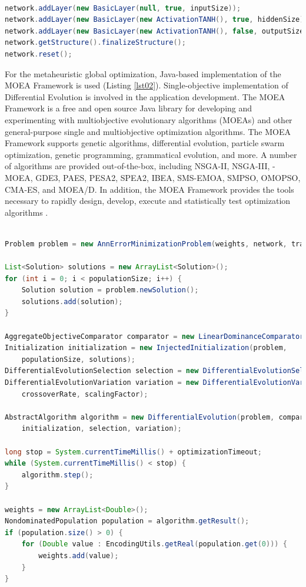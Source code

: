 \documentclass[a4paper,conference]{IEEEtran}
\begin{document}
\begin{lstlisting}[caption=Building artificial neural network, language=Java, basicstyle=\tiny, label=lst01]

network.addLayer(new BasicLayer(null, true, inputSize));
network.addLayer(new BasicLayer(new ActivationTANH(), true, hiddenSize));
network.addLayer(new BasicLayer(new ActivationTANH(), false, outputSize));
network.getStructure().finalizeStructure();
network.reset();

\end{lstlisting}

For the metaheuristic global optimization, Java-based implementation of the MOEA Framework is used (Listing \ref{lst02}). Single-objective implementation of Differential Evolution is involved in the application development. The MOEA Framework is a free and open source Java library for developing and experimenting with multiobjective evolutionary algorithms (MOEAs) and other general-purpose single and multiobjective optimization algorithms. The MOEA Framework supports genetic algorithms, differential evolution, particle swarm optimization, genetic programming, grammatical evolution, and more. A number of algorithms are provided out-of-the-box, including NSGA-II, NSGA-III, \varepsilon -MOEA, GDE3, PAES, PESA2, SPEA2, IBEA, SMS-EMOA, SMPSO, OMOPSO, CMA-ES, and MOEA/D. In addition, the MOEA Framework provides the tools necessary to rapidly design, develop, execute and statistically test optimization algorithms \cite{Hadka-01}.

\begin{lstlisting}[caption=Differential Evolution training, language=Java, basicstyle=\tiny, label=lst02]

Problem problem = new AnnErrorMinimizationProblem(weights, network, train);

List<Solution> solutions = new ArrayList<Solution>();
for (int i = 0; i < populationSize; i++) {
    Solution solution = problem.newSolution();
    solutions.add(solution);
}

AggregateObjectiveComparator comparator = new LinearDominanceComparator();
Initialization initialization = new InjectedInitialization(problem, 
    populationSize, solutions);
DifferentialEvolutionSelection selection = new DifferentialEvolutionSelection();
DifferentialEvolutionVariation variation = new DifferentialEvolutionVariation(
    crossoverRate, scalingFactor);

AbstractAlgorithm algorithm = new DifferentialEvolution(problem, comparator, 
    initialization, selection, variation);

long stop = System.currentTimeMillis() + optimizationTimeout;
while (System.currentTimeMillis() < stop) {
    algorithm.step();
}

weights = new ArrayList<Double>();
NondominatedPopulation population = algorithm.getResult();
if (population.size() > 0) {
    for (Double value : EncodingUtils.getReal(population.get(0))) {
        weights.add(value);
    }
}

\end{lstlisting}
\end{document}
